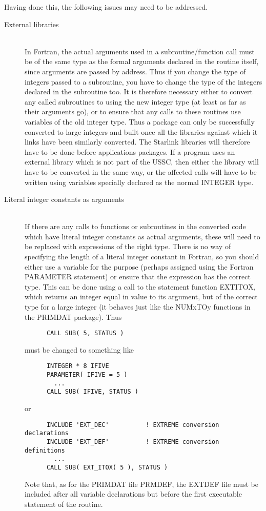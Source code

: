 \documentclass[twoside,11pt]{article}
\newcommand{\xref}[3]{#1}
\renewcommand{\_}{\texttt{\symbol{95}}}
\begin{document}
Having done this, the following issues may need to be addressed.
\begin{description}
%
\item[External libraries]\mbox{}
\\
In Fortran, the actual arguments used in a subroutine/function
call must be of the same type as the formal arguments declared
in the routine itself, since arguments are passed by address.
Thus if you change the type of integers passed to a subroutine,
you have to change the type of the integers declared in the subroutine too.
It is therefore necessary either to convert any called subroutines
to using the new integer type (at least as far as their arguments go), 
or to ensure that any calls to these routines use variables of 
the old integer type.
Thus a package can only be successfully converted to large integers
and built once all the libraries against which it links have been 
similarly converted.  The Starlink libraries will therefore have to
be done before applications packages.
If a program uses an external library which is not part of the USSC,
then either the library will have to be converted in the same way,
or the affected calls will have to be written using 
variables specially declared as the normal INTEGER type.
%
\item[Literal integer constants as arguments]\mbox{}
\\
If there are any calls to functions or subroutines in the converted 
code which have literal integer constants as actual arguments,
these will need to be replaced with expressions of the right type.
There is no way of specifying the length of a literal integer constant
in Fortran, so you should either use a variable for the purpose 
(perhaps assigned using the Fortran PARAMETER statement) 
or ensure that the expression
has the correct type.  This can be done using a call to the statement
function EXT\_ITOX, which returns an integer equal in value to its
argument, but of the correct type for a large integer
(it behaves just like the NUM\_xTOy functions in the 
\xref{PRIMDAT}{sun39}{} package).
Thus
\begin{squote}
\begin{verbatim}
      CALL SUB( 5, STATUS )
\end{verbatim}
\end{squote}
must be changed to something like
\begin{squote}
\begin{verbatim}
      INTEGER * 8 IFIVE
      PARAMETER( IFIVE = 5 )
        ...
      CALL SUB( IFIVE, STATUS )
\end{verbatim}
\end{squote}
or
\begin{squote}
\begin{verbatim}
      INCLUDE 'EXT_DEC'          ! EXTREME conversion declarations
      INCLUDE 'EXT_DEF'          ! EXTREME conversion definitions
        ...
      CALL SUB( EXT_ITOX( 5 ), STATUS )
\end{verbatim}
\end{squote}
Note that, as for the PRIMDAT file PRM\_DEF, the EXT\_DEF 
file must be included after all variable declarations but before
the first executable statement of the routine.


\end{description}
\end{document}
